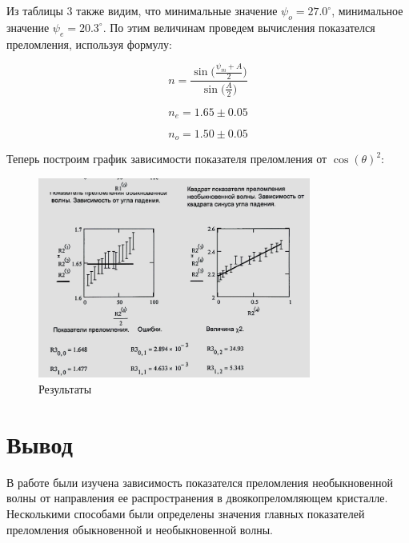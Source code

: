 \documentclass[a4paper]{article}
\begin{document}
\noindent Из таблицы 3 также видим, что минимальные значение $\psi_o = 27.0^\circ$, минимальное значение $\psi_e = 20.3^\circ$. По этим величинам проведем вычисления показателся преломления, используя формулу:

\begin{equation}
    n = \frac{ \sin\big( \frac{\psi_m + A}{2} \big) }{ \sin\big(\frac{A}{2}\big) }
\end{equation}

\begin{equation}
    n_e = 1.65 \pm 0.05
\end{equation}

\begin{equation}
    n_o = 1.50 \pm 0.05
\end{equation}

Теперь построим график зависимости показателя преломления от $\cos(\theta)^2$:

\begin{figure}[!h]
\centering
\includegraphics[width=0.8\textwidth]{2.png}
\caption{Результаты}
\label{}
\end{figure}

\section{Вывод}

В работе были изучена зависимость показателся преломления необыкновенной волны от направления ее распространения в двоякопреломляющем кристалле. Несколькими способами были определены значения главных показателей преломления обыкновенной и необыкновенной волны. 
\end{document}
